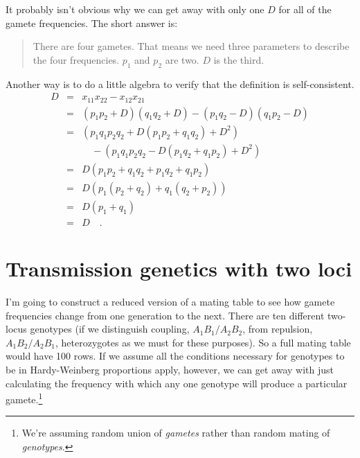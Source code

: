 \documentclass[12pt]{article}
\begin{document}
It probably isn't obvious why we can get away with only one $D$ for
all of the gamete frequencies. The short answer is:
\begin{quote}There are four gametes. That means we need three
  parameters to describe the four frequencies. $p_1$ and $p_2$ are
  two. $D$ is the third.
\end{quote}
Another way is to do a little algebra to verify that the definition is
self-consistent.
\begin{eqnarray*}
D &=& x_{11}x_{22} - x_{12}x_{21} \\
  &=& (p_1p_2 + D)(q_1q_2 + D) - (p_1q_2 - D)(q_1p_2 - D) \\
  &=& \left(p_1q_1p_2q_2 + D(p_1p_2 + q_1q_2) + D^2\right) \\
  && \quad - \left(p_1q_1p_2q_2 - D(p_1q_2 + q_1p_2) + D^2\right) \\
  &=& D(p_1p_2 + q_1q_2 + p_1q_2 + q_1p_2) \\
  &=& D\left(p_1(p_2 + q_2) + q_1(q_2 + p_2)\right) \\
  &=& D(p_1 + q_1) \\
  &=& D \quad. 
\end{eqnarray*}

\section*{Transmission genetics with two loci}

I'm going to construct a reduced version of a mating table to see how
gamete frequencies change from one generation to the next. There are
ten different two-locus genotypes (if we distinguish coupling,
$A_1B_1/A_2B_2$, from repulsion, $A_1B_2/A_2B_1$, heterozygotes as we
must for these purposes). So a full mating table would have 100
rows. If we assume all the conditions necessary for genotypes to be in
Hardy-Weinberg proportions apply, however, we can get away with just
calculating the frequency with which any one genotype will produce a
particular gamete.\footnote{We're assuming random union of {\it
    gametes\/} rather than random mating of {\it
    genotypes}.}
\end{document}
